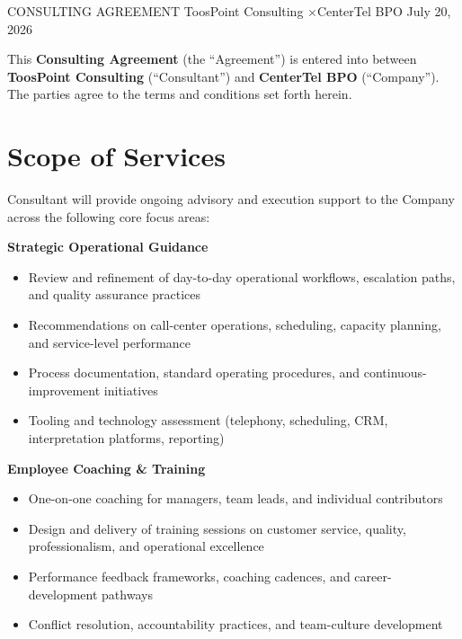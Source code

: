 \documentclass{toospoint}
\begin{document}
\contracttitle
  {CONSULTING AGREEMENT}
  {ToosPoint Consulting \quad×\quad CenterTel BPO}
  {July 20, 2026}

\begin{clausebox}
\sffamily\small
This \textbf{Consulting Agreement} (the ``Agreement'') is entered into between
\textbf{ToosPoint Consulting} (``Consultant'') and \textbf{CenterTel BPO}
(``Company''). The parties agree to the terms and conditions set forth herein.
\end{clausebox}

\vspace{10pt}

\section{Scope of Services}

Consultant will provide ongoing advisory and execution support to the Company
across the following core focus areas:

\vspace{4pt}
\noindent\textbf{\color{TPDark}Strategic Operational Guidance}
\begin{itemize}[leftmargin=1.5em, itemsep=2pt, topsep=2pt]
  \item Review and refinement of day-to-day operational workflows, escalation paths, and quality assurance practices
  \item Recommendations on call-center operations, scheduling, capacity planning, and service-level performance
  \item Process documentation, standard operating procedures, and continuous-improvement initiatives
  \item Tooling and technology assessment (telephony, scheduling, CRM, interpretation platforms, reporting)
\end{itemize}

\vspace{4pt}
\noindent\textbf{\color{TPDark}Employee Coaching \& Training}
\begin{itemize}[leftmargin=1.5em, itemsep=2pt, topsep=2pt]
  \item One-on-one coaching for managers, team leads, and individual contributors
  \item Design and delivery of training sessions on customer service, quality, professionalism, and operational excellence
  \item Performance feedback frameworks, coaching cadences, and career-development pathways
  \item Conflict resolution, accountability practices, and team-culture development
\end{itemize}
\end{document}
